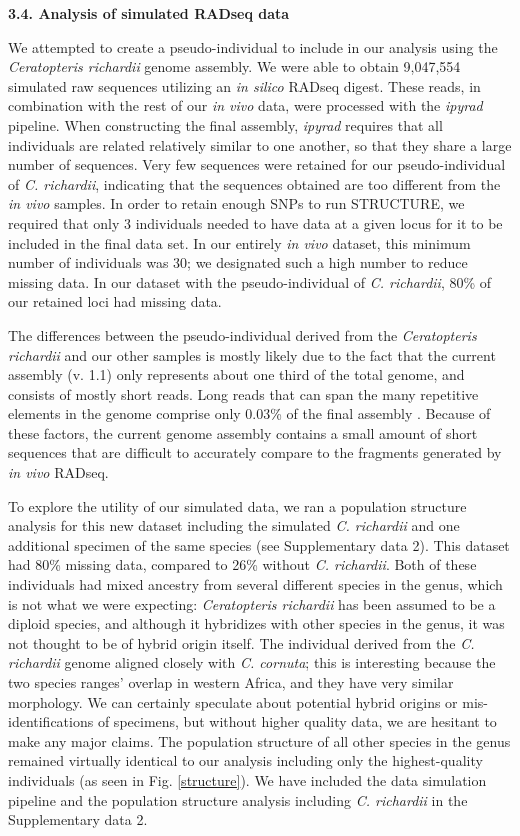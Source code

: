 \documentclass[12pt]{article}
\begin{document}
\begin{flushleft}
\textbf{3.4. Analysis of simulated RADseq data}

We attempted to create a pseudo-individual to include in our analysis using the \textit{Ceratopteris richardii} genome assembly. We were able to obtain 9,047,554 simulated raw sequences utilizing an \textit{in silico} RADseq digest. These reads, in combination with the rest of our \textit{in vivo} data, were processed with the \textit{ipyrad} pipeline. When constructing the final assembly, \textit{ipyrad} requires that all individuals are related relatively similar to one another, so that they share a large number of sequences. Very few sequences were retained for our pseudo-individual of \textit{C. richardii}, indicating that the sequences obtained are too different from the \textit{in vivo} samples. In order to retain enough SNPs to run STRUCTURE, we required that only 3 individuals needed to have data at a given locus for it to be included in the final data set. In our entirely \textit{in vivo} dataset, this minimum number of individuals was 30; we designated such a high number to reduce missing data. In our dataset with the pseudo-individual of \textit{C. richardii}, 80\% of our retained loci had missing data.

The differences between the pseudo-individual derived from the \textit{Ceratopteris richardii} and our other samples is mostly likely due to the fact that the current assembly (v. 1.1) only represents about one third of the total genome, and consists of mostly short reads. Long reads that can span the many repetitive elements in the genome comprise only 0.03\% of the final assembly \autocite{Marchant2019}. Because of these factors, the current genome assembly contains a small amount of short sequences that are difficult to accurately compare to the fragments generated by \textit{in vivo} RADseq. 

To explore the utility of our simulated data, we ran a population structure analysis \autocite{Pritchard2000} for this new dataset including the simulated \textit{C. richardii} and one additional specimen of the same species (see Supplementary data 2). This dataset had 80\% missing data, compared to 26\% without \textit{C. richardii}. Both of these individuals had mixed ancestry from several different species in the genus, which is not what we were expecting: \textit{Ceratopteris richardii} has been assumed to be a diploid species, and although it hybridizes with other species in the genus, it was not thought to be of hybrid origin itself. The individual derived from the \textit{C. richardii} genome aligned closely with \textit{C. cornuta}; this is interesting because the two species ranges’ overlap in western Africa, and they have very similar morphology. We can certainly speculate about potential hybrid origins or mis-identifications of specimens, but without higher quality data, we are hesitant to make any major claims. The population structure of all other species in the genus remained virtually identical to our analysis including only the highest-quality individuals (as seen in Fig. \ref{structure}). We have included the data simulation pipeline and the population structure analysis including \textit{C. richardii} in the Supplementary data 2.


\end{flushleft}
\end{document}
